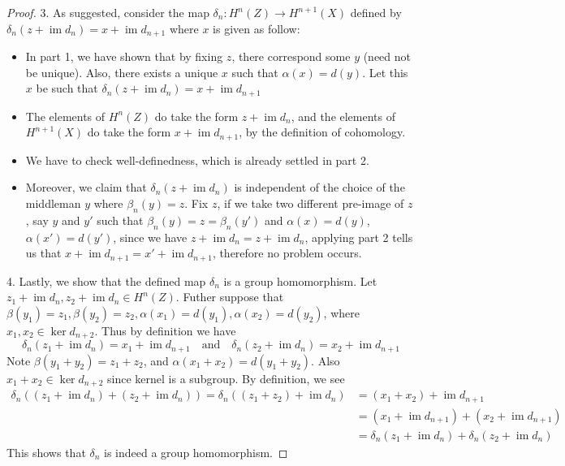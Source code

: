 \documentclass{article}
\theoremstyle{definition}
\newcommand{\im}{\operatorname{im}}
\begin{document}
\begin{proof}
    3. As suggested, consider the map $\delta_n:H^n(Z)\to H^{n+1}(X)$ defined by $\delta_n(z+\im d_n) = x+\im d_{n+1}$ where $x$ is given as follow:
    \begin{itemize}
        \item In part 1, we have shown that by fixing $z$, there correspond some $y$ (need not be unique). Also, there exists a unique $x$ such that $\alpha(x) = d(y)$. Let this $x$ be such that $\delta_n(z+\im d_n) = x+\im d_{n+1}$
        \item The elements of $H^n(Z)$ do take the form $z+\im d_n$, and the elements of $H^{n+1}(X)$ do take the form $x + \im d_{n+1}$, by the definition of cohomology.
        \item We have to check well-definedness, which is already settled in part 2.
        \item Moreover, we claim that $\delta_n(z+\im d_n)$ is independent of the choice of the middleman $y$ where $\beta_n(y) = z$. Fix $z$, if we take two different pre-image of $z$, say $y$ and $y'$ such that $\beta_n(y) = z = \beta_n(y')$ and $\alpha(x)=d(y)$, $\alpha(x')=d(y')$, since we have $z + \im d_n = z + \im d_n$, applying part 2 tells us that $x+ \im d_{n+1} = x' + \im d_{n+1}$, therefore no problem occurs.
    \end{itemize}

    4. Lastly, we show that the defined map $\delta_n$ is a group homomorphism. Let $z_1 + \im d_n, z_2 + \im d_n \in H^n(Z)$. Futher suppose that $\beta(y_1)=z_1, \beta(y_2)=z_2, \alpha(x_1)=d(y_1), \alpha(x_2)=d(y_2)$, where $x_1, x_2 \in \ker d_{n+2}$. Thus by definition we have 
    \[\delta_n(z_1+\im d_n) = x_1+\im d_{n+1} \quad \text{and} \quad \delta_n(z_2+\im d_n) = x_2+\im d_{n+1}\]
    Note $\beta(y_1+y_2) = z_1+z_2$, and $\alpha(x_1+x_2) = d(y_1 + y_2)$. Also $x_1 + x_2 \in \ker d_{n+2}$ since kernel is a subgroup. By definition, we see
    \begin{align*}
        \delta_n((z_1+\im d_n) + (z_2+\im d_n))=\delta_n((z_1+z_2)+\im d_n) 
        &= (x_1 + x_2) + \im d_{n+1}\\
        &= (x_1 + \im d_{n+1}) + (x_2 + \im d_{n+1})\\
        &= \delta_n(z_1+\im d_n) + \delta_n(z_2+\im d_n)
    \end{align*}
    This shows that $\delta_n$ is indeed a group homomorphism.
\end{proof}
\end{document}
